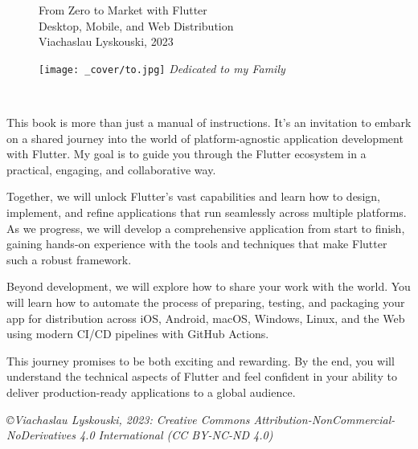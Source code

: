 
\thispagestyle{empty}

\begin{figure}
  \begin{minipage}{0.59\textwidth}
    \large From Zero to Market with Flutter\\
    \vspace{9mm}
    \noindent \small Desktop, Mobile, and Web Distribution\\
    \vspace{10mm}
    Viachaslau Lyskouski, 2023\\
    \vspace{2mm}
  \end{minipage}
  \hfill
  \begin{minipage}{0.31\textwidth}
    \texttt{[image: \_cover/to.jpg]}
    \emph{Dedicated to my Family}\\
  \end{minipage}
\end{figure}
~
\vspace{2cm}

\noindent This book is more than just a manual of instructions. It's an invitation to embark on a shared journey into 
the world of platform-agnostic application development with Flutter. My goal is to guide you through the Flutter 
ecosystem in a practical, engaging, and collaborative way.

Together, we will unlock Flutter's vast capabilities and learn how to design, implement, and refine applications that 
run seamlessly across multiple platforms. As we progress, we will develop a comprehensive application from start to 
finish, gaining hands-on experience with the tools and techniques that make Flutter such a robust framework.

Beyond development, we will explore how to share your work with the world. You will learn how to automate the process 
of preparing, testing, and packaging your app for distribution across iOS, Android, macOS, Windows, Linux, and the Web 
using modern CI/CD pipelines with GitHub Actions.

This journey promises to be both exciting and rewarding. By the end, you will understand the technical aspects of 
Flutter and feel confident in your ability to deliver production-ready applications to a global audience.


\vspace{1cm}

\noindent \emph{\small \copyright Viachaslau Lyskouski, 2023: Creative Commons Attribution-NonCommercial-NoDerivatives 
4.0 International (CC BY-NC-ND 4.0)}

\newpage
\thispagestyle{empty}
~